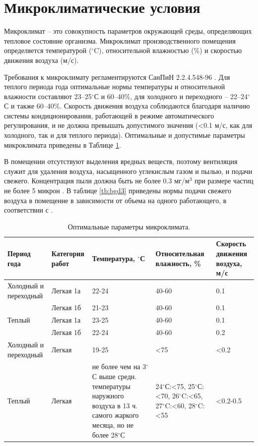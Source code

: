 \documentclass[12pt,a4paper]{report}
\begin{document}
\section{Микроклиматические условия}

Микроклимат – это совокупность параметров окружающей среды, определяющих тепловое состояние организма. Микроклимат производственного помещения определяется температурой ($^\circ$C), относительной влажностью (\%) и скоростью движения воздуха (м/с). 

Требования к микроклимату регламентируются СанПиН 2.2.4.548-96 \cite{SanPin-Climat}. Для теплого периода года оптимальные нормы температуры и относительной влажности составляют 23–25$^\circ$С и 60–40\%, для холодного и переходного -- 22–24$^\circ$С и также 60–40\%. Скорость движения воздуха соблюдаются благодаря наличию системы кондиционирования, работающей в режиме автоматического регулирования, и не должна превышать допустимого значения (<0.1 м/с, как для холодного, так и для теплого периода).
Оптимальные и допустимые параметры микроклимата приведены в Таблице \ref{tb:bgd2}.

В помещении отсутствуют выделения вредных веществ, поэтому вентиляция служит для удаления воздуха, насыщенного углекислым газом и пылью, и подачи свежего. Концентрация пыли должна быть не более 0.3 мг/м$^3$ при размере частиц не более 5 микрон \cite{bgd19}. В таблице \ref{tb:bgd3} приведены нормы подачи свежего воздуха в помещение в зависимости от объема на одного работающего, в соответствии с \cite{SanPin-Hygiene}.

\begin{table}[H]
\begin{center}
\begin{tabular}{|p{4.5cm}|p{2cm}|p{3cm}|p{3cm}|p{2cm}|}
\hline
Период года	 &Категория работ  &Температура, $^\circ$С  &Относительная влажность, \%  &Скорость движения воздуха, м/с \\
\hline
Холодный и переходный  &Легкая 1а  &22-24  &40-60	&0.1\\
&Легкая 1б  &21-23  &40-60  &0.1\\
\hline
Теплый &Легкая 1а  &23-25  &40-60	&0.1\\
&Легкая 1б  &22-24  &40-60  &0.2\\
\hline
Холодный и переходный  &Легкая  &19-25  &<75  &<0.2\\
\hline
Теплый  &Легкая  &не более чем на 3$^\circ$С выше средн. температуры наружного воздуха в 13 ч. самого жаркого месяца, но не более 28$^\circ$С  &24$^\circ$С:<75, 25$^\circ$С:<70, 26$^\circ$C:<65, 27$^\circ$C:<60, 28$^\circ$C:<55  &<0.2-0.5\\
\hline
\end{tabular}
\end{center}
\caption{Оптимальные параметры микроклимата.}
\label{tb:bgd2} 
\end{table}
\end{document}
